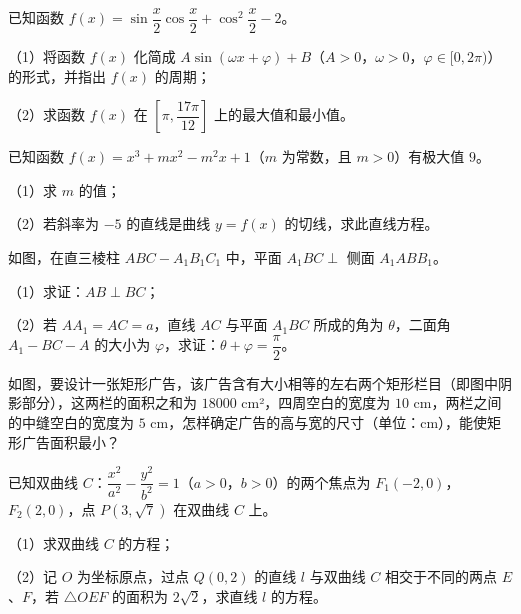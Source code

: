 \begin{question}
已知函数 $f(x)=\sin\dfrac x2\cos\dfrac x2+\cos^2\dfrac x2-2$。

（1）将函数 $f(x)$ 化简成 $A\sin(\omega x+\varphi)+B$（$A>0$，$\omega>0$，$\varphi\in[0,2\pi)$）的形式，并指出 $f(x)$ 的周期；

（2）求函数 $f(x)$ 在 $\left[\pi,\dfrac{17\pi}{12}\right]$ 上的最大值和最小值。

\end{question}
\begin{question}
已知函数 $f(x)=x^3+mx^2-m^2x+1$（$m$ 为常数，且 $m>0$）有极大值 $9$。

（1）求 $m$ 的值；

（2）若斜率为 $-5$ 的直线是曲线 $y=f(x)$ 的切线，求此直线方程。

\Needspace{0.4\textheight}
\end{question}
\begin{question}
如图，在直三棱柱 $ABC-A_1B_1C_1$ 中，平面 $A_1BC\perp$ 侧面 $A_1ABB_1$。

（1）求证：$AB\perp BC$；

（2）若 $AA_1=AC=a$，直线 $AC$ 与平面 $A_1BC$ 所成的角为 $\theta$，二面角 $A_1-BC-A$ 的大小为 $\varphi$，求证：$\theta+\varphi=\dfrac{\pi}2$。
\nopagebreak[4]
\begin{center}\end{center}
\nopagebreak[4]
\Needspace{0.4\textheight}
\end{question}
\begin{question}
如图，要设计一张矩形广告，该广告含有大小相等的左右两个矩形栏目（即图中阴影部分），这两栏的面积之和为 $18000$ cm²，四周空白的宽度为 $10$ cm，两栏之间的中缝空白的宽度为 $5$ cm，怎样确定广告的高与宽的尺寸（单位：cm），能使矩形广告面积最小？
\nopagebreak[4]
\begin{center}\end{center}
\nopagebreak[4]
\end{question}
\begin{question}
已知双曲线 $C$：$\dfrac{x^2}{a^2}-\dfrac{y^2}{b^2}=1$（$a>0$，$b>0$）的两个焦点为 $F_1(-2,0)$，$F_2(2,0)$，点 $P(3,\sqrt7)$ 在双曲线 $C$ 上。

（1）求双曲线 $C$ 的方程；

（2）记 $O$ 为坐标原点，过点 $Q(0,2)$ 的直线 $l$ 与双曲线 $C$ 相交于不同的两点 $E$、$F$，若 $\triangle OEF$ 的面积为 $2\sqrt2$，求直线 $l$ 的方程。

\end{question}
